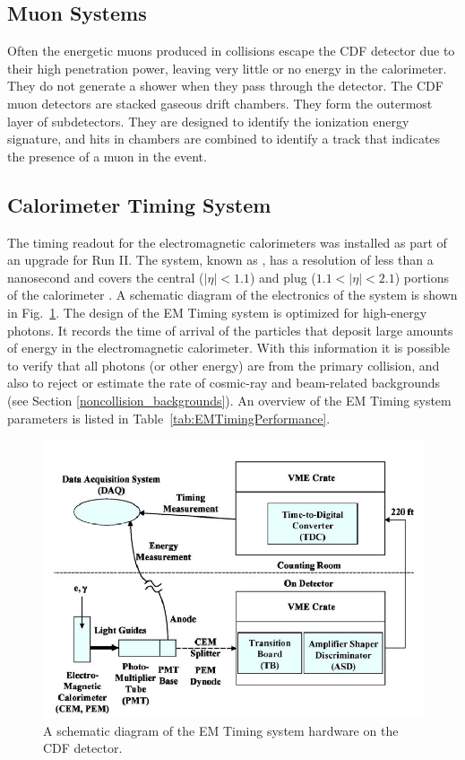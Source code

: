 \subsection{Muon Systems}\label{muon_system}
Often the energetic muons produced in collisions escape the CDF detector due to their high penetration power, leaving very little or no energy in the calorimeter. They do not generate a shower when they pass through the detector. The CDF muon detectors are stacked gaseous drift chambers. They form the outermost layer of subdetectors. They are designed to identify the ionization energy signature, and hits in chambers are combined to identify a track that indicates the presence of a muon in the event.

\subsection{Calorimeter Timing System}\label{EMTiming}
The timing readout for the electromagnetic calorimeters was installed as part of an upgrade for Run II. The system, known as , has a resolution of less than a nanosecond and covers the central ($|\eta| < 1.1$) and plug ($1.1 < |\eta| < 2.1$) portions of the calorimeter \cite{pap:EMtiming}. A schematic diagram of the electronics of the system is shown in Fig.~\ref{fig:EMtimingSchematic}. The design of the EM Timing system is optimized for high-energy photons. It records the time of arrival of the particles that deposit large amounts of energy in the electromagnetic calorimeter. With this information it is possible to verify that all photons (or other energy) are from the primary collision, and also to reject or estimate the rate of cosmic-ray and beam-related backgrounds (see Section \ref{noncollision_backgrounds}). An overview of the EM Timing system parameters is listed in Table~\ref{tab:EMTimingPerformance}.

\begin{figure}[htb!]
 \centering
 \includegraphics[scale=0.5,keepaspectratio=true]{./EMtimingSchematic.png}
 \caption{A schematic diagram of the EM Timing system hardware on the CDF detector.}
 \label{fig:EMtimingSchematic}
\end{figure}

